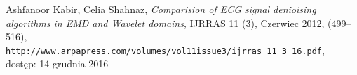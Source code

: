 \begin{thebibliography}{9}
        Ashfanoor Kabir, Celia Shahnaz, 
        \textit{Comparision of ECG signal denioising algorithms in EMD and
        Wavelet domains}, IJRRAS 11 (3), Czerwiec 2012, (499--516),\\
        \verb+http://www.arpapress.com/volumes/vol11issue3/ijrras_11_3_16.pdf+,\\
        dostęp: 14 grudnia 2016

\end{thebibliography}